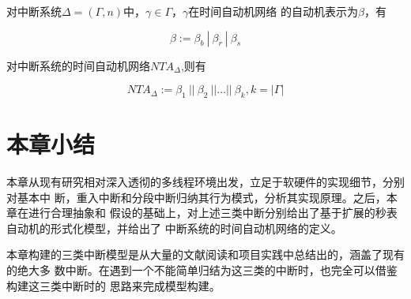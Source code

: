 对中断系统$\Delta=(\varGamma, n)$中，$\gamma\in\varGamma$，$\gamma$在时间自动机网络
的自动机表示为$\beta$，有

\begin{equation}
	\beta := \beta_b~|~\beta_r~|~\beta_s
\end{equation}

对中断系统的时间自动机网络$NTA_\Delta$,则有

\begin{equation}
	NTA_\Delta := \beta_1~||~\beta_2~||\dots||~\beta_k, k = |\varGamma|
\end{equation}

\section{本章小结}
\label{sec:sum_3}

本章从现有研究相对深入透彻的多线程环境出发，立足于软硬件的实现细节，分别对基本中
断，重入中断和分段中断归纳其行为模式，分析其实现原理。之后，本章在进行合理抽象和
假设的基础上，对上述三类中断分别给出了基于扩展的秒表自动机的形式化模型，并给出了
中断系统的时间自动机网络的定义。

本章构建的三类中断模型是从大量的文献阅读和项目实践中总结出的，涵盖了现有的绝大多
数中断。在遇到一个不能简单归结为这三类的中断时，也完全可以借鉴构建这三类中断时的
思路来完成模型构建。



